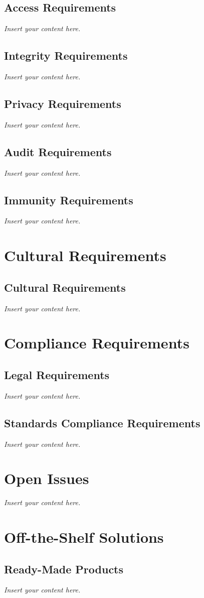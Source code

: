 \documentclass[12pt]{article}
\newcommand{\lips}{\textit{Insert your content here.}}
\begin{document}
\subsection{Access Requirements}
\lips
\subsection{Integrity Requirements}
\lips
\subsection{Privacy Requirements}
\lips
\subsection{Audit Requirements}
\lips
\subsection{Immunity Requirements}
\lips

\section{Cultural Requirements}
\subsection{Cultural Requirements}
\lips

\section{Compliance Requirements}
\subsection{Legal Requirements}
\lips
\subsection{Standards Compliance Requirements}
\lips

\section{Open Issues}
\lips

\section{Off-the-Shelf Solutions}
\subsection{Ready-Made Products}
\lips
\end{document}
